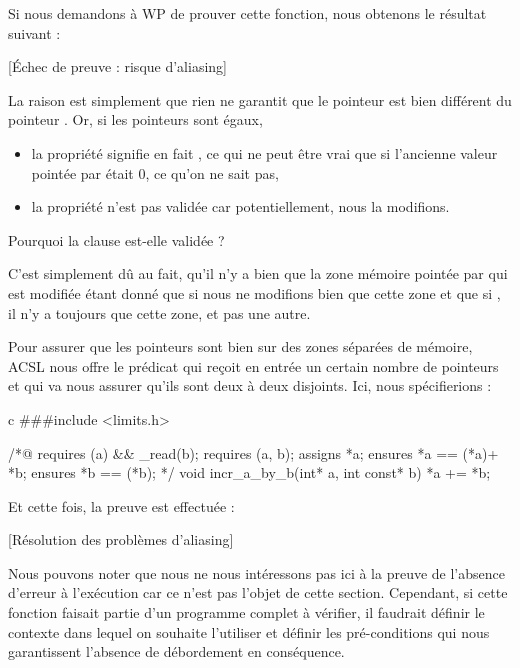 Si nous demandons à WP de prouver cette fonction, nous obtenons le 
résultat suivant :



[Échec de preuve : risque d'aliasing]


La raison est simplement que rien ne garantit que le pointeur  est bien
différent du pointeur . Or, si les pointeurs sont égaux,



\begin{itemize}
\item la propriété  signifie en fait 
, ce qui ne peut être vrai que si l'ancienne valeur 
pointée par  était 0, ce qu'on ne sait pas,
\item la propriété  n'est pas validée car potentiellement,
nous la modifions.
\end{itemize}


\begin{Question}
Pourquoi la clause  est-elle validée ?

C'est simplement dû au fait, qu'il n'y a bien que la zone mémoire pointée par
 qui est modifiée étant donné que si  nous ne modifions bien 
que cette zone et que si , il n'y a toujours que cette zone, et 
pas une autre.
\end{Question}


Pour assurer que les pointeurs sont bien sur des zones séparées de mémoire, 
ACSL nous offre le prédicat  qui reçoit en entrée 
un certain nombre de pointeurs et qui va nous assurer qu'ils sont deux à deux 
disjoints. Ici, nous spécifierions :



\begin{CodeBlock}{c}
###include <limits.h>

/*@
  requires \valid(a) && \valid_read(b);
  requires \separated(a, b);
  assigns  *a;
  ensures  *a == \old(*a)+ *b;
  ensures  *b == \old(*b);
*/
void incr_a_by_b(int* a, int const* b){
  *a += *b;
}
\end{CodeBlock}



Et cette fois, la preuve est effectuée :



[Résolution des problèmes d'aliasing]


Nous pouvons noter que nous ne nous intéressons pas ici à la preuve de 
l'absence d'erreur à l'exécution car ce n'est pas l'objet de cette section.
Cependant, si cette fonction faisait partie d'un programme complet à vérifier,
il faudrait définir le contexte dans lequel on souhaite l'utiliser et définir
les pré-conditions qui nous garantissent l'absence de débordement en conséquence.
